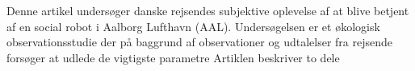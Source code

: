 Denne artikel undersøger danske rejsendes subjektive oplevelse af at blive betjent af en social robot i Aalborg Lufthavn (AAL). Undersøgelsen er et økologisk observationsstudie der på baggrund af observationer og udtalelser fra rejsende forsøger at udlede de vigtigste parametre Artiklen beskriver to dele
